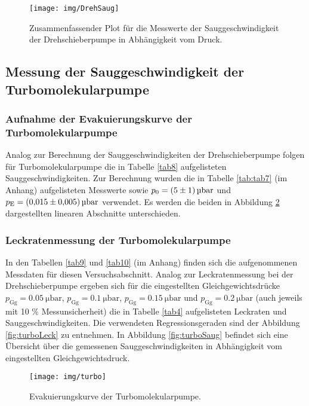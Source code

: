 \begin{figure}
	\centering
	\texttt{[image: img/DrehSaug]}
	\caption{Zusammenfassender Plot für die Messwerte der Sauggeschwindigkeit der Drehschieberpumpe in Abhängigkeit vom Druck.}
	\label{fig:drehSaug}
\end{figure}


\subsection{Messung der Sauggeschwindigkeit der Turbomolekularpumpe}

\subsubsection{Aufnahme der Evakuierungskurve der Turbomolekularpumpe}

Analog zur Berechnung der Sauggeschwindigkeiten der Drehschieberpumpe folgen für Turbomolekularpumpe die in Tabelle \ref{tab8} aufgelisteten Sauggeschwindigkeiten. Zur Berechnung wurden die in Tabelle \ref{tab:tab7} (im Anhang) aufgelisteten Messwerte sowie $p_0 = \SI{5 +- 1}{\micro \bar}$ und $p_\text{E} = \SI{0.015 +- 0.005}{\micro \bar}$ verwendet. Es werden die beiden in Abbildung \ref{fig:turbo} dargestellten linearen Abschnitte unterschieden. 

\subsubsection{Leckratenmessung der Turbomolekularpumpe}

In den Tabellen \ref{tab9} und \ref{tab10} (im Anhang) finden sich die aufgenommenen Messdaten für diesen Versuchsabschnitt. Analog zur Leckratenmessung bei der Drehschieberpumpe ergeben sich für die eingestellten Gleichgewichtsdrücke $p_\text{Gg} = \SI{0.05}{\micro \bar}$, $p_\text{Gg} = \SI{0.1}{\micro \bar}$, $p_\text{Gg} = \SI{0.15}{\micro \bar}$ und $p_\text{Gg} = \SI{0.2}{\micro \bar}$ (auch jeweils mit 10 \% Messunsicherheit) die in Tabelle \ref{tab4} aufgelisteten Leckraten und Sauggeschwindigkeiten. Die verwendeten Regressionsgeraden sind der Abbildung \ref{fig:turboLeck} zu entnehmen. In Abbildung \ref{fig:turboSaug} befindet sich eine Übersicht über die gemessenen Sauggeschwindigkeiten in Abhängigkeit vom eingestellten Gleichgewichtsdruck.




	 
\begin{figure}
	\centering
	\texttt{[image: img/turbo]}
	\caption{Evakuierungskurve der Turbomolekularpumpe.}
	\label{fig:turbo}
\end{figure}

